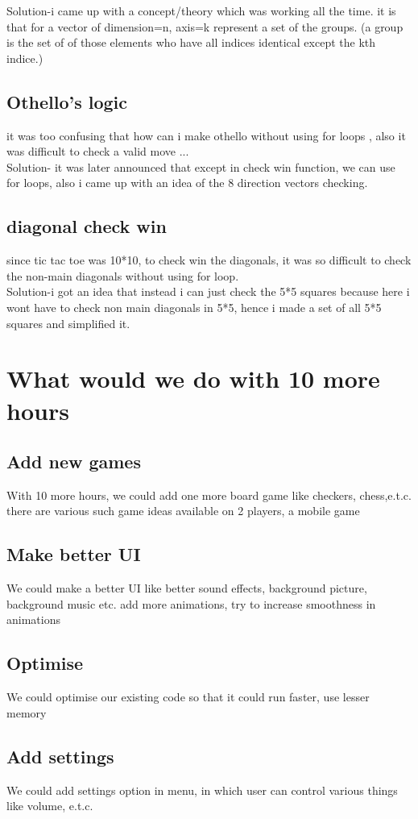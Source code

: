 \documentclass{article}
\begin{document}
Solution-i came up with a concept/theory which was working all the time.
it is that for a vector of dimension=n, axis=k represent a set of the groups. (a group is the set of of those elements who have all indices identical except the kth indice.)

\subsection{Othello's logic}
it was too confusing that how can i make othello without using for loops , also it was difficult to check a valid move ...
\\
Solution- it was later announced that except in check win function, we can use for loops, also i came up with an idea of the 8 direction vectors checking.

\subsection{diagonal check win}
since tic tac toe was 10*10, to check win the diagonals, it was so difficult to check the non-main diagonals without using for loop.
\\
Solution-i got an idea that instead i can just check the 5*5 squares because here i wont have to check non main diagonals in 5*5, hence i made a set of all 5*5 squares and simplified it.

\clearpage
\section{What would we do with 10 more hours}
\subsection{Add new games}
With 10 more hours, we could add one more board game like checkers, chess,e.t.c.
there are various such game ideas available on 2 players, a mobile game
\subsection{Make better UI}
We could make a better UI like better sound effects, background picture, background music etc.
add more animations, try to increase smoothness in animations
\subsection{Optimise}
We could optimise our existing code so that it could run faster, use lesser memory
\subsection{Add settings}
We could add settings option in menu, in which user can control various things like volume, e.t.c.
\clearpage



\end{document}
